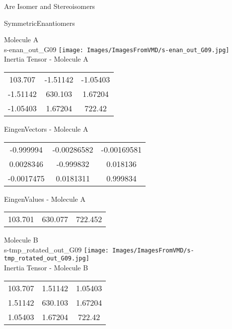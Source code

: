 \begin{center}
\vtab
\vtab
\textcolor{NavyBlue}{\Large Are Isomer and Stereoisomers}
\end{center}
\newpage

\vtab[-2cm]
\begin{center}
{\large SymmetricEnantiomers}
\end{center}
\begin{multicols}{2}
\begin{center}
Molecule A \\ 
s-enan\_out\_G09
\texttt{[image: Images/ImagesFromVMD/s-enan\_out\_G09.jpg]}
\\
Inertia Tensor - Molecule A \\
\vtab
\begin{tabular}{|c c c|}
103.707	 & 	-1.51142	 & 	-1.05403	 \\
-1.51142	 & 	630.103	 & 	1.67204	 \\
-1.05403	 & 	1.67204	 & 	722.42
\end{tabular}

\vtab
 EingenVectors - Molecule A     \\
\vtab
\begin{tabular}{|c c c|}
-0.999994	 & 	-0.00286582	 & 	-0.00169581	 \\
0.0028346	 & 	-0.999832	 & 	0.018136	 \\
-0.0017475	 & 	0.0181311	 & 	0.999834
\end{tabular}

\vtab
 EingenValues - Molecule A     \\
\vtab
\begin{tabular}{|c c c|}
103.701	 & 	630.077	 & 	722.452
\end{tabular}
\columnbreak

Molecule B \\ 
s-tmp\_rotated\_out\_G09
\texttt{[image: Images/ImagesFromVMD/s-tmp\_rotated\_out\_G09.jpg]}
\\
Inertia Tensor - Molecule B \\
\vtab
\begin{tabular}{|c c c|}
103.707	 & 	1.51142	 & 	1.05403	 \\
1.51142	 & 	630.103	 & 	1.67204	 \\
1.05403	 & 	1.67204	 & 	722.42
\end{tabular}


\end{center}
\end{multicols}
